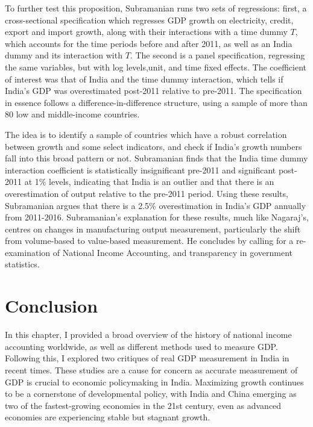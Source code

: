 \documentclass[12pt,nobind, a4paper]{reedthesis}
\begin{document}
 To further test this proposition, Subramanian runs two sets of regressions: first, a cross-sectional specification which regresses GDP growth on electricity, credit, export and import growth, along with their interactions with a time dummy \(T\), which accounts for the time periods before and after 2011, as well as an India dummy and its interaction with \(T\). The second is a panel specification, regressing the same variables, but with log levels,unit, and time fixed effects. The coefficient of interest was that of India and the time dummy interaction, which tells if India's GDP was overestimated post-2011 relative to pre-2011. The specification in essence follows a difference-in-difference structure, using a sample of more than 80 low and middle-income countries.
 \linebreak

 The idea is to identify a sample of countries which have a robust correlation between growth and some select indicators, and check if India's growth numbers fall into this broad pattern or not. Subramanian finds that the India time dummy interaction coefficient is statistically insignificant pre-2011 and significant post-2011 at 1\% levels, indicating that India is an outlier and that there is an overestimation of output relative to the pre-2011 period. Using these results, Subramanian argues that there is a 2.5\% overestimation in India's GDP annually from 2011-2016. Subramanian's explanation for these results, much like Nagaraj's, centres on changes in manufacturing output measurement, particularly the shift from volume-based to value-based measurement. He concludes by calling for a re-examination of National Income Accounting, and transparency in government statistics.

 \hypertarget{ccn}{%
 \section{Conclusion}\label{ccn}}

 In this chapter, I provided a broad overview of the history of national income accounting worldwide, as well as different methods used to measure GDP. Following this, I explored two critiques of real GDP measurement in India in recent times. These studies are a cause for concern as accurate measurement of GDP is crucial to economic policymaking in India. Maximizing growth continues to be a cornerstone of developmental policy, with India and China emerging as two of the fastest-growing economies in the 21st century, even as advanced economies are experiencing stable but stagnant growth.
 \linebreak
\end{document}
